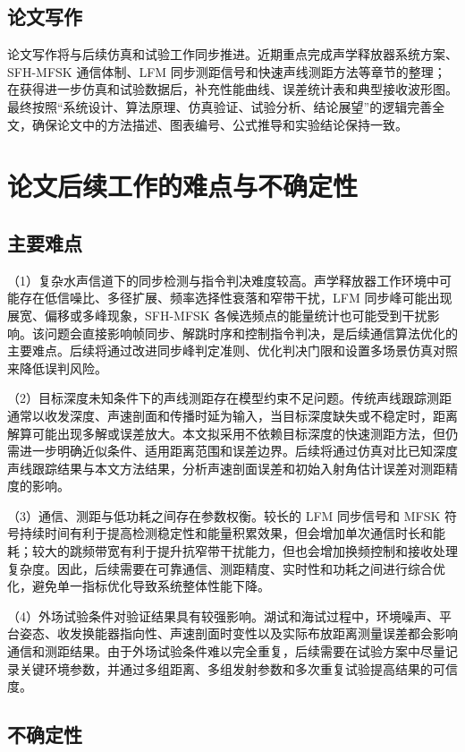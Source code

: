 \subsection{论文写作}

论文写作将与后续仿真和试验工作同步推进。近期重点完成声学释放器系统方案、SFH-MFSK 通信体制、LFM 同步测距信号和快速声线测距方法等章节的整理；在获得进一步仿真和试验数据后，补充性能曲线、误差统计表和典型接收波形图。最终按照“系统设计、算法原理、仿真验证、试验分析、结论展望”的逻辑完善全文，确保论文中的方法描述、图表编号、公式推导和实验结论保持一致。

\section{论文后续工作的难点与不确定性}

\subsection{主要难点}

（1）复杂水声信道下的同步检测与指令判决难度较高。声学释放器工作环境中可能存在低信噪比、多径扩展、频率选择性衰落和窄带干扰，LFM 同步峰可能出现展宽、偏移或多峰现象，SFH-MFSK 各候选频点的能量统计也可能受到干扰影响。该问题会直接影响帧同步、解跳时序和控制指令判决，是后续通信算法优化的主要难点。后续将通过改进同步峰判定准则、优化判决门限和设置多场景仿真对照来降低误判风险。

（2）目标深度未知条件下的声线测距存在模型约束不足问题。传统声线跟踪测距通常以收发深度、声速剖面和传播时延为输入，当目标深度缺失或不稳定时，距离解算可能出现多解或误差放大。本文拟采用不依赖目标深度的快速测距方法，但仍需进一步明确近似条件、适用距离范围和误差边界。后续将通过仿真对比已知深度声线跟踪结果与本文方法结果，分析声速剖面误差和初始入射角估计误差对测距精度的影响。

（3）通信、测距与低功耗之间存在参数权衡。较长的 LFM 同步信号和 MFSK 符号持续时间有利于提高检测稳定性和能量积累效果，但会增加单次通信时长和能耗；较大的跳频带宽有利于提升抗窄带干扰能力，但也会增加换频控制和接收处理复杂度。因此，后续需要在可靠通信、测距精度、实时性和功耗之间进行综合优化，避免单一指标优化导致系统整体性能下降。

（4）外场试验条件对验证结果具有较强影响。湖试和海试过程中，环境噪声、平台姿态、收发换能器指向性、声速剖面时变性以及实际布放距离测量误差都会影响通信和测距结果。由于外场试验条件难以完全重复，后续需要在试验方案中尽量记录关键环境参数，并通过多组距离、多组发射参数和多次重复试验提高结果的可信度。

\subsection{不确定性}

